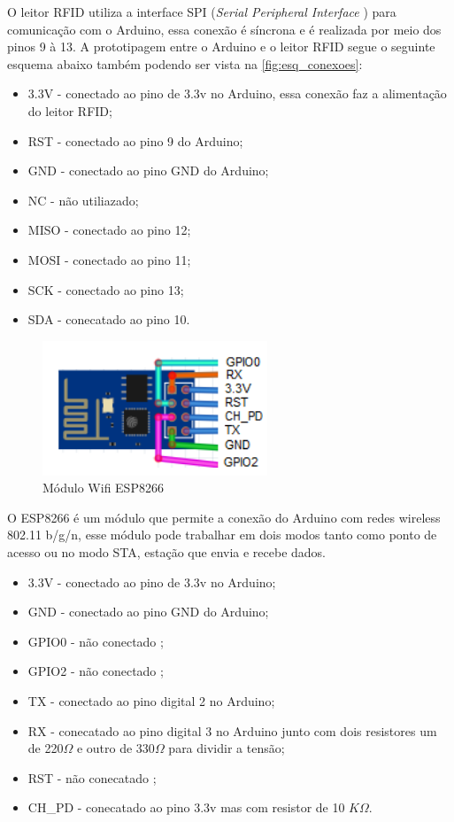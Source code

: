 \par
O leitor RFID utiliza a interface SPI (\textit{Serial Peripheral Interface} ) para comunicação com o Arduino, essa conexão é síncrona e é realizada por meio dos pinos  9 à 13. A prototipagem entre o Arduino e o leitor RFID segue o seguinte esquema abaixo também podendo ser vista na \autoref{fig:esq_conexoes}:
\begin{itemize}
    \item 3.3V - conectado ao pino de 3.3v no Arduino, essa conexão faz a alimentação do leitor RFID;
    \item RST - conectado ao pino 9 do Arduino;
    \item GND - conectado ao pino GND do Arduino;
    \item NC - não utiliazado;
    \item MISO - conectado ao pino 12;
    \item MOSI - conectado ao pino 11; 
    \item SCK - conectado ao pino 13;
    \item SDA - conecatado ao pino 10.
\end{itemize}
\begin{figure}[H]
              \caption{\label{fig:moduloWii}{Módulo Wifi ESP8266}}
              \centering
              \includegraphics[width=0.6\textwidth]{Figuras/Modulo_ESP8266.png}
\end{figure}
\par
O ESP8266 é um módulo que permite a conexão do Arduino com redes wireless 802.11 b/g/n, esse módulo pode trabalhar em dois modos tanto como ponto de acesso ou no modo STA, estação que envia e recebe dados. 
\begin{itemize}
    \item 3.3V - conectado ao pino de 3.3v no Arduino;
    \item GND - conectado ao pino GND do Arduino;
    \item GPIO0 - não conectado ;
    \item GPIO2 - não conectado ; 
    \item TX - conectado ao pino digital 2 no Arduino;
    \item RX - conecatado ao pino digital 3 no Arduino junto com dois resistores um de 220$\Omega$ e outro de 330$\Omega$ para dividir a tensão;
    \item RST - não conecatado ;
    \item CH\_PD - conecatado ao pino 3.3v mas com resistor de 10 $K\Omega$.
\end{itemize}
